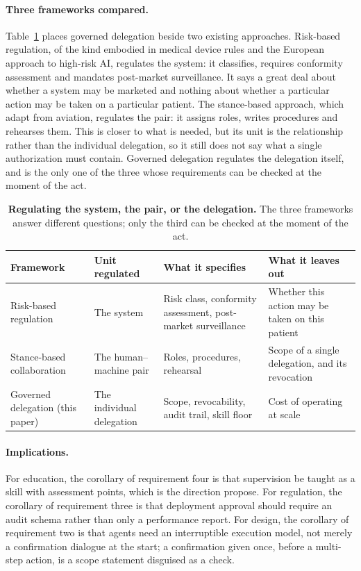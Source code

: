\paragraph{Three frameworks compared.}
Table~\ref{tab:frameworks} places governed delegation beside two existing approaches. Risk-based regulation, of the kind embodied in medical device rules and the European approach to high-risk AI, regulates the system: it classifies, requires conformity assessment and mandates post-market surveillance. It says a great deal about whether a system may be marketed and nothing about whether a particular action may be taken on a particular patient. The stance-based approach, which \citet{ong2026flight} adapt from aviation, regulates the pair: it assigns roles, writes procedures and rehearses them. This is closer to what is needed, but its unit is the relationship rather than the individual delegation, so it still does not say what a single authorization must contain. Governed delegation regulates the delegation itself, and is the only one of the three whose requirements can be checked at the moment of the act.

\begin{table}[t]
\centering\footnotesize
\setlength{\tabcolsep}{5pt}
\begin{tabular}{@{}p{3.6cm}p{2.9cm}p{4.3cm}p{3.8cm}@{}}
\toprule
Framework & Unit regulated & What it specifies & What it leaves out \\
\midrule
Risk-based regulation & The system & Risk class, conformity assessment, post-market surveillance & Whether this action may be taken on this patient \\
Stance-based collaboration \citep{ong2026flight} & The human--machine pair & Roles, procedures, rehearsal & Scope of a single delegation, and its revocation \\
Governed delegation (this paper) & The individual delegation & Scope, revocability, audit trail, skill floor & Cost of operating at scale \\
\bottomrule
\end{tabular}
\caption{\textbf{Regulating the system, the pair, or the delegation.} The three frameworks answer different questions; only the third can be checked at the moment of the act.}
\label{tab:frameworks}
\end{table}

\paragraph{Implications.}
For education, the corollary of requirement four is that supervision be taught as a skill with assessment points, which is the direction \citet{abdulnour2025education} propose. For regulation, the corollary of requirement three is that deployment approval should require an audit schema rather than only a performance report. For design, the corollary of requirement two is that agents need an interruptible execution model, not merely a confirmation dialogue at the start; a confirmation given once, before a multi-step action, is a scope statement disguised as a check.

